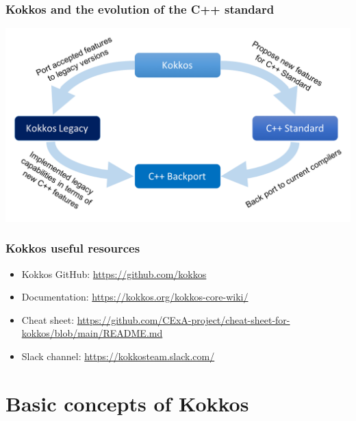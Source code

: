 \documentclass[aspectratio=169]{beamer}
\begin{document}

\begin{frame}
    \frametitle{Kokkos and the evolution of the C++ standard} 
    \begin{center}
        \includegraphics[width=\textwidth]{../../images/kokkos-cpp-standard.png}
    \end{center}
\end{frame}


\begin{frame}
    \frametitle{Kokkos useful resources} 
    \begin{itemize}
        \item Kokkos GitHub: \href{https://github.com/kokkos}{https://github.com/kokkos}
        \item Documentation: \href{https://kokkos.org/kokkos-core-wiki/}{https://kokkos.org/kokkos-core-wiki/}
        \item Cheat sheet: \href{https://github.com/CExA-project/cheat-sheet-for-kokkos/blob/main/README.md}{https://github.com/CExA-project/cheat-sheet-for-kokkos/blob/main/README.md}
        \item Slack channel: \href{https://kokkosteam.slack.com/}{https://kokkosteam.slack.com/}
    \end{itemize}
\end{frame}


\section{Basic concepts of Kokkos}
\end{document}
